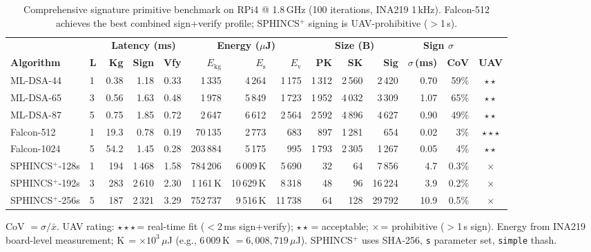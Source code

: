 \begin{table}[t]
\centering
\caption{Comprehensive signature primitive benchmark on RPi4 @ 1.8\,GHz (100 iterations, INA219 1\,kHz).
  Falcon-512 achieves the best combined sign+verify profile; SPHINCS$^+$ signing is UAV-prohibitive ($>$1\,s).}
\label{tab:sig_full}
\footnotesize
\setlength{\tabcolsep}{3pt}
\begin{tabular}{@{}ll rrr rrr rrr rr c@{}}
\toprule
& & \multicolumn{3}{c}{\textbf{Latency (ms)}} & \multicolumn{3}{c}{\textbf{Energy ($\mu$J)}} & \multicolumn{3}{c}{\textbf{Size (B)}} & \multicolumn{2}{c}{\textbf{Sign $\sigma$}} & \\
\cmidrule(lr){3-5}\cmidrule(lr){6-8}\cmidrule(lr){9-11}\cmidrule(lr){12-13}
\textbf{Algorithm} & \textbf{L} & \textbf{Kg} & \textbf{Sign} & \textbf{Vfy} &
  \textbf{$E_\text{kg}$} & \textbf{$E_\text{s}$} & \textbf{$E_\text{v}$} &
  \textbf{PK} & \textbf{SK} & \textbf{Sig} &
  \textbf{$\sigma$\,(ms)} & \textbf{CoV} & \textbf{UAV} \\
\midrule
ML-DSA-44   & 1 & 0.38  & 1.18   & 0.33  & 1\,335    & 4\,264      & 1\,175   & 1\,312 & 2\,560 & 2\,420  & 0.70  & 59\% & $\star\star$ \\
ML-DSA-65   & 3 & 0.56  & 1.63   & 0.48  & 1\,978    & 5\,849      & 1\,723   & 1\,952 & 4\,032 & 3\,309  & 1.07  & 65\% & $\star\star$ \\
ML-DSA-87   & 5 & 0.75  & 1.85   & 0.72  & 2\,647    & 6\,612      & 2\,564   & 2\,592 & 4\,896 & 4\,627  & 0.90  & 49\% & $\star\star$ \\
\addlinespace
Falcon-512  & 1 & 19.3  & 0.78   & 0.19  & 70\,135   & 2\,773      & 683      &   897  & 1\,281 &   654   & 0.02  &  3\% & $\star\star\star$ \\
Falcon-1024 & 5 & 54.2  & 1.45   & 0.28  & 203\,884  & 5\,175      & 995      & 1\,793 & 2\,305 & 1\,267  & 0.05  &  4\% & $\star\star$ \\
\addlinespace
SPHINCS$^+$-128s & 1 & 194   & 1\,468  & 1.58  & 784\,206   & 6\,009\,K  & 5\,690   & 32  & 64  & 7\,856  & 4.7   & 0.3\% & $\times$ \\
SPHINCS$^+$-192s & 3 & 283   & 2\,610  & 2.30  & 1\,161\,K  & 10\,629\,K & 8\,318   & 48  & 96  & 16\,224 & 3.9   & 0.2\% & $\times$ \\
SPHINCS$^+$-256s & 5 & 187   & 2\,321  & 3.29  & 752\,737   & 9\,516\,K  & 11\,738  & 64  & 128 & 29\,792 & 10.9  & 0.5\% & $\times$ \\
\bottomrule
\end{tabular}
\begin{tablenotes}
\item CoV $= \sigma / \bar{x}$.  UAV rating: $\star\star\star$\,= real-time fit ($<$2\,ms sign+verify);
  $\star\star$\,= acceptable; $\times$\,= prohibitive ($>$1\,s sign).
  Energy from INA219 board-level measurement; K$\,=\times10^3$\,$\mu$J (e.g., 6\,009\,K $= 6{,}008{,}719$\,$\mu$J).
  SPHINCS$^+$ uses SHA-256, \texttt{s} parameter set, \texttt{simple} thash.
\end{tablenotes}
\end{table}

